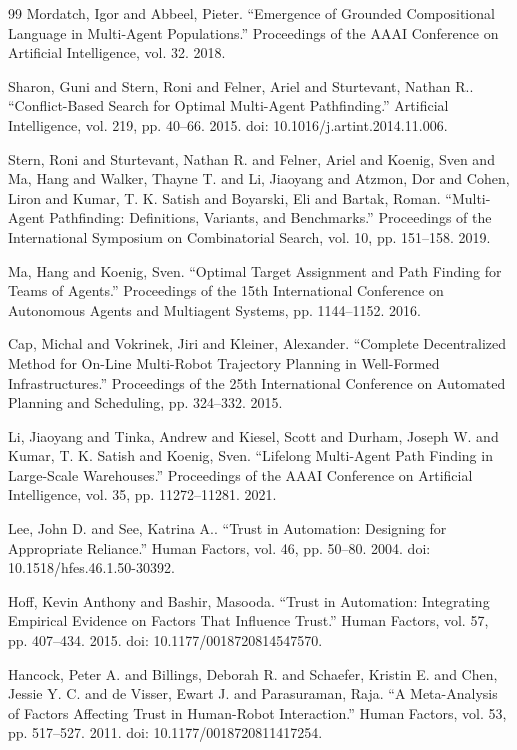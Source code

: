 \documentclass[preprint,12pt]{elsarticle}
\begin{document}
\begin{thebibliography}{99}
 Mordatch, Igor and Abbeel, Pieter. ``Emergence of Grounded Compositional Language in Multi-Agent Populations.'' Proceedings of the AAAI Conference on Artificial Intelligence, vol. 32. 2018.

 Sharon, Guni and Stern, Roni and Felner, Ariel and Sturtevant, Nathan R.. ``Conflict-Based Search for Optimal Multi-Agent Pathfinding.'' Artificial Intelligence, vol. 219, pp. 40--66. 2015. doi: 10.1016/j.artint.2014.11.006.

 Stern, Roni and Sturtevant, Nathan R. and Felner, Ariel and Koenig, Sven and Ma, Hang and Walker, Thayne T. and Li, Jiaoyang and Atzmon, Dor and Cohen, Liron and Kumar, T. K. Satish and Boyarski, Eli and Bartak, Roman. ``Multi-Agent Pathfinding: Definitions, Variants, and Benchmarks.'' Proceedings of the International Symposium on Combinatorial Search, vol. 10, pp. 151--158. 2019.

 Ma, Hang and Koenig, Sven. ``Optimal Target Assignment and Path Finding for Teams of Agents.'' Proceedings of the 15th International Conference on Autonomous Agents and Multiagent Systems, pp. 1144--1152. 2016.

 Cap, Michal and Vokrinek, Jiri and Kleiner, Alexander. ``Complete Decentralized Method for On-Line Multi-Robot Trajectory Planning in Well-Formed Infrastructures.'' Proceedings of the 25th International Conference on Automated Planning and Scheduling, pp. 324--332. 2015.

 Li, Jiaoyang and Tinka, Andrew and Kiesel, Scott and Durham, Joseph W. and Kumar, T. K. Satish and Koenig, Sven. ``Lifelong Multi-Agent Path Finding in Large-Scale Warehouses.'' Proceedings of the AAAI Conference on Artificial Intelligence, vol. 35, pp. 11272--11281. 2021.

 Lee, John D. and See, Katrina A.. ``Trust in Automation: Designing for Appropriate Reliance.'' Human Factors, vol. 46, pp. 50--80. 2004. doi: 10.1518/hfes.46.1.50-30392.

 Hoff, Kevin Anthony and Bashir, Masooda. ``Trust in Automation: Integrating Empirical Evidence on Factors That Influence Trust.'' Human Factors, vol. 57, pp. 407--434. 2015. doi: 10.1177/0018720814547570.

 Hancock, Peter A. and Billings, Deborah R. and Schaefer, Kristin E. and Chen, Jessie Y. C. and de Visser, Ewart J. and Parasuraman, Raja. ``A Meta-Analysis of Factors Affecting Trust in Human-Robot Interaction.'' Human Factors, vol. 53, pp. 517--527. 2011. doi: 10.1177/0018720811417254.


\end{thebibliography}
\end{document}
